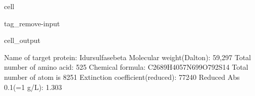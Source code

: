 \documentclass[letterpaper,10pt,english]{jupyterBook}
\begin{document}
\begin{sphinxuseclass}{cell}
\begin{sphinxuseclass}{tag_remove-input}\begin{sphinxVerbatimOutput}

\begin{sphinxuseclass}{cell_output}
\begin{sphinxVerbatim}[commandchars=\\\{\}]
\PYGZsh{} Name of target protein: \PYGZhy{}\PYGZhy{}\PYGZhy{}\PYGZhy{}\PYGZhy{}\PYGZhy{}\PYGZhy{}\PYGZhy{}\PYGZhy{}\PYGZhy{}\PYGZhy{}\PYGZhy{}\PYGZhy{}\PYGZhy{}\PYGZhy{}\PYGZhy{}\PYGZhy{}\PYGZhy{}\PYGZhy{}\PYGZhy{}\PYGZhy{}\PYGZhy{}\PYGZhy{}\PYGZhy{}\PYGZhy{}Idursulfasebeta
\PYGZsh{} Molecular weight(Dalton): \PYGZhy{}\PYGZhy{}\PYGZhy{}\PYGZhy{}\PYGZhy{}\PYGZhy{}\PYGZhy{}\PYGZhy{}\PYGZhy{}\PYGZhy{}\PYGZhy{}\PYGZhy{}\PYGZhy{}\PYGZhy{}\PYGZhy{}\PYGZhy{}\PYGZhy{}\PYGZhy{}\PYGZhy{}\PYGZhy{}\PYGZhy{}\PYGZhy{}\PYGZhy{}\PYGZhy{}\PYGZhy{}\PYGZhy{}\PYGZhy{}\PYGZhy{}\PYGZhy{}\PYGZhy{}\PYGZhy{}\PYGZhy{}59,297
\PYGZsh{} Total number of amino acid: \PYGZhy{}\PYGZhy{}\PYGZhy{}\PYGZhy{}\PYGZhy{}\PYGZhy{}\PYGZhy{}\PYGZhy{}\PYGZhy{}\PYGZhy{}\PYGZhy{}\PYGZhy{}\PYGZhy{}\PYGZhy{}\PYGZhy{}\PYGZhy{}\PYGZhy{}\PYGZhy{}\PYGZhy{}\PYGZhy{}\PYGZhy{}\PYGZhy{}\PYGZhy{}\PYGZhy{}\PYGZhy{}\PYGZhy{}\PYGZhy{}\PYGZhy{}\PYGZhy{}\PYGZhy{}\PYGZhy{}\PYGZhy{}\PYGZhy{}525
\PYGZsh{} Chemical formula: \PYGZhy{}\PYGZhy{}\PYGZhy{}\PYGZhy{}\PYGZhy{}\PYGZhy{}\PYGZhy{}\PYGZhy{}\PYGZhy{}\PYGZhy{}\PYGZhy{}\PYGZhy{}\PYGZhy{}\PYGZhy{}\PYGZhy{}\PYGZhy{}\PYGZhy{}\PYGZhy{}\PYGZhy{}\PYGZhy{}\PYGZhy{}\PYGZhy{}\PYGZhy{}\PYGZhy{}\PYGZhy{}C2689H4057N699O792S14
\PYGZsh{} Total number of atom is \PYGZhy{}\PYGZhy{}\PYGZhy{}\PYGZhy{}\PYGZhy{}\PYGZhy{}\PYGZhy{}\PYGZhy{}\PYGZhy{}\PYGZhy{}\PYGZhy{}\PYGZhy{}\PYGZhy{}\PYGZhy{}\PYGZhy{}\PYGZhy{}\PYGZhy{}\PYGZhy{}\PYGZhy{}\PYGZhy{}\PYGZhy{}\PYGZhy{}\PYGZhy{}\PYGZhy{}\PYGZhy{}\PYGZhy{}\PYGZhy{}\PYGZhy{}\PYGZhy{}\PYGZhy{}\PYGZhy{}\PYGZhy{}\PYGZhy{}\PYGZhy{}\PYGZhy{}\PYGZhy{}8251
\PYGZsh{} Extinction coefficient(reduced): \PYGZhy{}\PYGZhy{}\PYGZhy{}\PYGZhy{}\PYGZhy{}\PYGZhy{}\PYGZhy{}\PYGZhy{}\PYGZhy{}\PYGZhy{}\PYGZhy{}\PYGZhy{}\PYGZhy{}\PYGZhy{}\PYGZhy{}\PYGZhy{}\PYGZhy{}\PYGZhy{}\PYGZhy{}\PYGZhy{}\PYGZhy{}\PYGZhy{}\PYGZhy{}\PYGZhy{}\PYGZhy{}\PYGZhy{}77240
\PYGZsh{} Reduced Abs 0.1\PYGZpc{}(=1 g/L): \PYGZhy{}\PYGZhy{}\PYGZhy{}\PYGZhy{}\PYGZhy{}\PYGZhy{}\PYGZhy{}\PYGZhy{}\PYGZhy{}\PYGZhy{}\PYGZhy{}\PYGZhy{}\PYGZhy{}\PYGZhy{}\PYGZhy{}\PYGZhy{}\PYGZhy{}\PYGZhy{}\PYGZhy{}\PYGZhy{}\PYGZhy{}\PYGZhy{}\PYGZhy{}\PYGZhy{}\PYGZhy{}\PYGZhy{}\PYGZhy{}\PYGZhy{}\PYGZhy{}\PYGZhy{}\PYGZhy{}\PYGZhy{}\PYGZhy{}1.303

\end{sphinxVerbatim}
\end{sphinxuseclass}
\end{sphinxVerbatimOutput}
\end{sphinxuseclass}
\end{sphinxuseclass}
\end{document}
